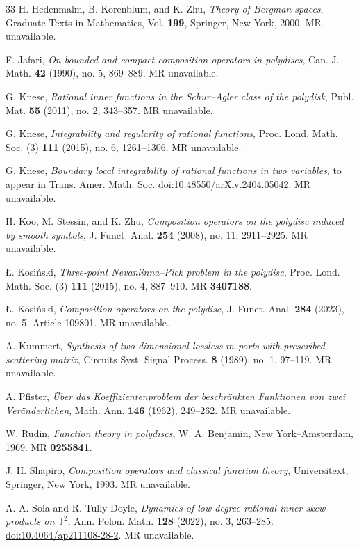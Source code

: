 \documentclass[12pt]{amsart}
\numberwithin{equation}{section}
\begin{document}
\begin{thebibliography}{33}
H. Hedenmalm, B. Korenblum, and K. Zhu,
\textit{Theory of Bergman spaces},
Graduate Texts in Mathematics, Vol. \textbf{199},
Springer, New York, 2000.
MR unavailable.

F. Jafari,
\textit{On bounded and compact composition operators in polydiscs},
Can. J. Math. \textbf{42} (1990), no. 5, 869--889.
MR unavailable.

G. Knese,
\textit{Rational inner functions in the Schur--Agler class of the polydisk},
Publ. Mat. \textbf{55} (2011), no. 2, 343--357.
MR unavailable.

G. Knese,
\textit{Integrability and regularity of rational functions},
Proc. Lond. Math. Soc. (3) \textbf{111} (2015), no. 6, 1261--1306.
MR unavailable.

G. Knese,
\textit{Boundary local integrability of rational functions in two variables},
to appear in Trans. Amer. Math. Soc.
\href{https://doi.org/10.48550/arXiv.2404.05042}{doi:10.48550/arXiv.2404.05042}.
MR unavailable.

H. Koo, M. Stessin, and K. Zhu,
\textit{Composition operators on the polydisc induced by smooth symbols},
J. Funct. Anal. \textbf{254} (2008), no. 11, 2911--2925.
MR unavailable.

\L{}. Kosi\'nski,
\textit{Three-point Nevanlinna--Pick problem in the polydisc},
Proc. Lond. Math. Soc. (3) \textbf{111} (2015), no. 4, 887--910.
MR \textbf{3407188}.

\L{}. Kosi\'nski,
\textit{Composition operators on the polydisc},
J. Funct. Anal. \textbf{284} (2023), no. 5, Article 109801.
MR unavailable.

A. Kummert,
\textit{Synthesis of two-dimensional lossless $m$-ports with prescribed scattering matrix},
Circuits Syst. Signal Process. \textbf{8} (1989), no. 1, 97--119.
MR unavailable.

A. Pfister,
\textit{\"Uber das Koeffizientenproblem der beschr\"ankten Funktionen von zwei Ver\"anderlichen},
Math. Ann. \textbf{146} (1962), 249--262.
MR unavailable.

W. Rudin,
\textit{Function theory in polydiscs},
W. A. Benjamin, New York--Amsterdam, 1969.
MR \textbf{0255841}.

J. H. Shapiro,
\textit{Composition operators and classical function theory},
Universitext,
Springer, New York, 1993.
MR unavailable.

A. A. Sola and R. Tully-Doyle,
\textit{Dynamics of low-degree rational inner skew-products on $\mathbb{T}^2$},
Ann. Polon. Math. \textbf{128} (2022), no. 3, 263--285.
\href{https://doi.org/10.4064/ap211108-28-2}{doi:10.4064/ap211108-28-2}.
MR unavailable.

\end{thebibliography}
\end{document}
